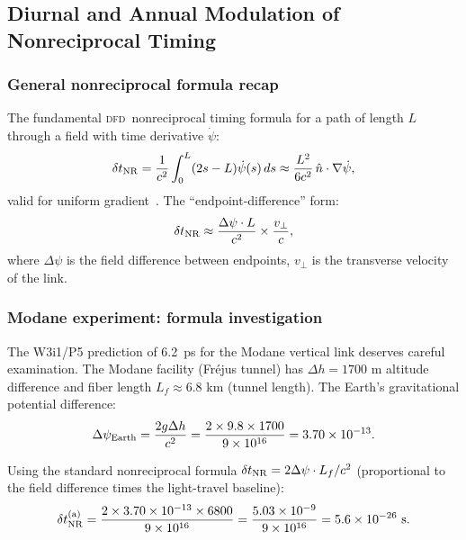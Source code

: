\documentclass[aps,prd,twocolumn,superscriptaddress,nofootinbib,longbibliography]{revtex4-2}
\newcommand{\DFD}{\textsc{dfd}}
\begin{document}
\subsection{Diurnal and Annual Modulation of Nonreciprocal Timing}
\label{sec:diurnal}

\subsubsection{General nonreciprocal formula recap}
\label{sec:NR-recap}

The fundamental \DFD\ nonreciprocal timing formula for a path
of length $L$ through a field with time derivative $\dot\psi$:
\begin{equation}\label{eq:NR-fundamental}
\delta t_{\rm NR} = \frac{1}{c^2}\int_0^L(2s-L)\dot\psi(s)\,ds
\approx \frac{L^2}{6c^2}\,\hat{n}\cdot\nabla\dot\psi,
\end{equation}
valid for uniform gradient~\cite{AlcockNavTiming2026}.
The ``endpoint-difference'' form:
\begin{equation}\label{eq:NR-endpoint}
\delta t_{\rm NR} \approx \frac{\Delta\psi\cdot L}{c^2}
\times\frac{v_\perp}{c},
\end{equation}
where $\Delta\psi$ is the field difference between endpoints,
$v_\perp$ is the transverse velocity of the link.

\subsubsection{Modane experiment: formula investigation}
\label{sec:modane-formula}

The W3i1/P5 prediction of 6.2~ps for the Modane vertical link
deserves careful examination.  The Modane facility (Fr\'{e}jus
tunnel) has $\Delta h = 1700$ m altitude difference and fiber
length $L_f \approx 6.8$ km (tunnel length).  The Earth's
gravitational potential difference:
\begin{equation}
\Delta\psi_{\rm Earth} = \frac{2g\Delta h}{c^2}
= \frac{2\times9.8\times1700}{9\times10^{16}} = 3.70\times10^{-13}.
\end{equation}

Using the standard nonreciprocal formula $\delta t_{\rm NR}
= 2\Delta\psi\cdot L_f/c^2$ (proportional to the field difference
times the light-travel baseline):
\begin{equation}
\delta t_{\rm NR}^{\rm (a)} = \frac{2\times3.70\times10^{-13}\times6800}{9\times10^{16}}
= \frac{5.03\times10^{-9}}{9\times10^{16}} = 5.6\times10^{-26}\ \si{s}.
\end{equation}
\end{document}
